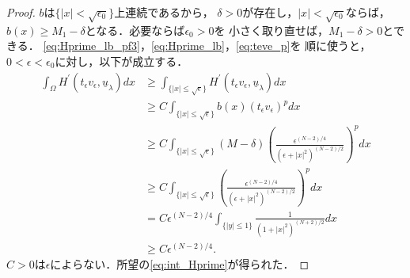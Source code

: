 \begin{proof}
 $b$は$\{ \lvert x \rvert < \sqrt{\epsilon_0}\}$上連続であるから，
 $\delta > 0$が存在し，$\lvert x \rvert < \sqrt{\epsilon_0}$ならば，
 $b(x) \geq M_1 - \delta$となる．必要ならば$\epsilon_0 > 0$を
 小さく取り直せば，$M_1 - \delta > 0$とできる．
 \eqref{eq:Hprime_lb_pf3}，\eqref{eq:Hprime_lb}，\eqref{eq:teve_p}を
 順に使うと，
 $0 < \epsilon < \epsilon_0$に対し，以下が成立する．
 \begin{align*}
  \int_\Omega H^\prime(t_\epsilon v_\epsilon, \underline{u}_\lambda )
  dx & \geq \int_{\{ \lvert x \rvert \leq \sqrt{\epsilon} \}} 
  H^\prime(t_\epsilon v_\epsilon, \underline{u}_\lambda ) dx \\
  & \geq C \int_{\{ \lvert x \rvert \leq \sqrt{\epsilon} \}} 
  b(x) (t_\epsilon v_\epsilon)^p dx \\
  & \geq C \int_{\{ \lvert x \rvert \leq \sqrt{\epsilon} \}} 
  (M - \delta) \left(
  \frac{\epsilon^{(N-2)/4}}{(\epsilon + \lvert x \rvert^2)^{(N-2)/2}}
  \right)^p dx \\
  & \geq C \int_{\{ \lvert x \rvert \leq \sqrt{\epsilon} \}} 
  \left(
  \frac{\epsilon^{(N-2)/4}}{(\epsilon + \lvert x \rvert^2)^{(N-2)/2}}
  \right)^p dx \\
  & = C \epsilon^{(N-2)/4} \int_{ \{ \lvert y \rvert \leq 1 \}}
  \frac{1}{(1 + \lvert x \rvert^2)^{(N+2)/2}} dx \\
  & \geq C \epsilon^{(N-2)/4}.
 \end{align*}
 $C>0$は$\epsilon$によらない．所望の\eqref{eq:int_Hprime}が得られた．\qedhere
\end{proof}

